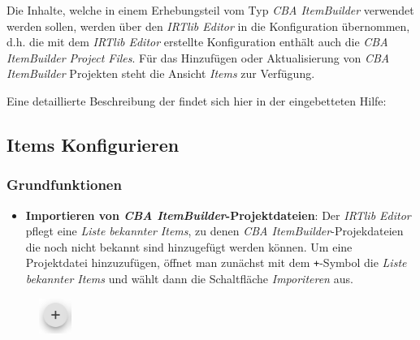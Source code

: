 \documentclass[
  letterpaper,
  DIV=11]{scrreprt}
\providecommand{\tightlist}{%
  \setlength{\itemsep}{0pt}\setlength{\parskip}{0pt}}\usepackage{longtable,booktabs,array}
\begin{document}
Die Inhalte, welche in einem Erhebungsteil vom Typ \emph{CBA
ItemBuilder} verwendet werden sollen, werden über den \emph{IRTlib
Editor} in die Konfiguration übernommen, d.h. die mit dem \emph{IRTlib
Editor} erstellte Konfiguration enthält auch die \emph{CBA ItemBuilder}
\emph{Project Files}. Für das Hinzufügen oder Aktualisierung von
\emph{CBA ItemBuilder} Projekten steht die Ansicht \emph{Items} zur
Verfügung.

Eine detaillierte Beschreibung der findet sich hier in der eingebetteten
Hilfe:

\begin{tcolorbox}[enhanced jigsaw, colbacktitle=quarto-callout-tip-color!10!white, coltitle=black, colframe=quarto-callout-tip-color-frame, leftrule=.75mm, breakable, opacitybacktitle=0.6, toprule=.15mm, title=\textcolor{quarto-callout-tip-color}{\faLightbulb}\hspace{0.5em}{Eingebettete Programmhilfe}, colback=white, titlerule=0mm, arc=.35mm, bottomtitle=1mm, toptitle=1mm, rightrule=.15mm, bottomrule=.15mm, left=2mm, opacityback=0]

\hypertarget{items-konfigurieren-1}{%
\subsection{Items Konfigurieren}\label{items-konfigurieren-1}}

\hypertarget{grundfunktionen-1}{%
\subsubsection{Grundfunktionen}\label{grundfunktionen-1}}

\begin{itemize}
\tightlist
\item
  \textbf{Importieren von \emph{CBA ItemBuilder}-Projektdateien}: Der
  \emph{IRTlib Editor} pflegt eine \emph{Liste bekannter Items}, zu
  denen \emph{CBA ItemBuilder}-Projekdateien die noch nicht bekannt sind
  hinzugefügt werden können. Um eine Projektdatei hinzuzufügen, öffnet
  man zunächst mit dem \texttt{+}-Symbol die \emph{Liste bekannter
  Items} und wählt dann die Schaltfläche \emph{Imporiteren} aus.
\end{itemize}

\begin{figure}[H]

\includegraphics[width=0.41667in,height=\textheight]{img/screenshot-add-project-plus-icon.png} \hfill{}


\end{figure}
\end{tcolorbox}
\end{document}
